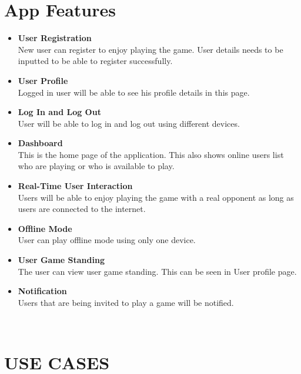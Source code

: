 \documentclass{scrartcl}
\begin{document}
\section{App Features}
    \begin{itemize}
    	\item \textbf{User Registration}\\
    	New user can register to enjoy playing the game.  User details needs to be inputted to be able to register successfully.
    	\item \textbf{User Profile}\\
    	Logged in user will be able to see his profile details in this page.
    	\item \textbf{Log In and Log Out}\\
    	User will be able to log in and log out using different devices.
    	\item \textbf{Dashboard}\\
    	This is the home page of the application.  This also shows online users list who are playing or who is available to play.
    	\item \textbf{Real-Time User Interaction}\\
    	Users will be able to enjoy playing the game with a real opponent as long as users are connected to the internet.
    	\item \textbf{Offline Mode}\\ 
    	User can play offline mode using only one device.
    	\item \textbf{User Game Standing}\\
    	The user can view user game standing.  This can be seen in User profile page.
    	\item \textbf{Notification}\\
    	Users that are being invited to play a game will be notified.
    \end{itemize}
    ~\newline

\section{USE CASES}
\end{document}
